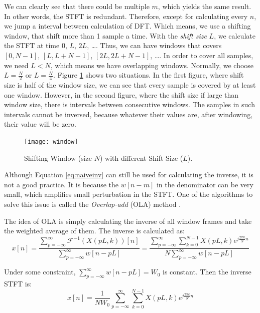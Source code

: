 \documentclass[12pt,final,twoside]{report}
\theoremstyle{plain}
\theoremstyle{definition}
\theoremstyle{remark}
\begin{document}
We can clearly see that there could be multiple $m$, which yields the same result. In other words, the STFT is redundant. Therefore, except for calculating every $n$, we jump a interval between calculation of DFT. Which means, we use a shifting window, that shift more than 1 sample a time. With the \textit{shift size} $L$, we calculate the STFT at time $0$, $L$, $2L$, \dots. Thus, we can have windows that covers $[0, N-1]$, $[L, L+N-1]$, $[2L, 2L+N-1]$, \dots. In order to cover all samples, we need $L<N$, which means we have overlapping windows. Normally, we choose $L = \frac{N}{2}$ or $L = \frac{N}{4}$. Figure \ref{fig:window} shows two situations. In the first figure, where shift size is half of the window size, we can see that every sample is covered by at least one window. However, in the second figure, where the shift size if large than window size, there is intervals between consecutive windows. The samples in such intervals cannot be inversed, because whatever their values are, after windowing, their value will be zero. 

\begin{figure}[thbp]
  \centering
  \texttt{[image: window]}
  \caption{Shifting Window (size $N$) with different Shift Size ($L$).}
  \label{fig:window}
\end{figure}

Although Equation \ref{eq:naiveinv} can still be used for calculating the inverse, it is not a good practice. It is because the $w[n-m]$ in the denominator can be very small, which amplifies small perturbation in the STFT. One of the algorithms to solve this issue is called the \textit{Overlap-add} (OLA) method \cite{crochiere_weighted_1980}.

The idea of OLA is simply calculating the inverse of all window frames and take the weighted average of them. The inverse is calculated as:
\begin{equation}
  x[n] = \frac{\sum_{p=-\infty}^{\infty} \mathcal{F}^{-1}(X(pL,k))[n]}{\sum_{p=-\infty}^{\infty} w[n-pL]}
  = \frac{\sum_{p=-\infty}^{\infty} \sum_{k=0}^{N-1} X(pL,k)e^{j \frac{2\pi k}{N} n}}{N\sum_{p=-\infty}^{\infty} w[n-pL]}
\end{equation}

Under some constraint, $\sum_{p=-\infty}^{\infty} w[n-pL] = W_0$ is constant. Then the inverse STFT is:
\begin{equation}
  x[n] = \frac{1}{NW_0} \sum_{p=-\infty}^{\infty} \sum_{k=0}^{N-1} X(pL,k)e^{j \frac{2\pi k}{N} n} 
  \label{eq:olainv}
\end{equation}
\end{document}

